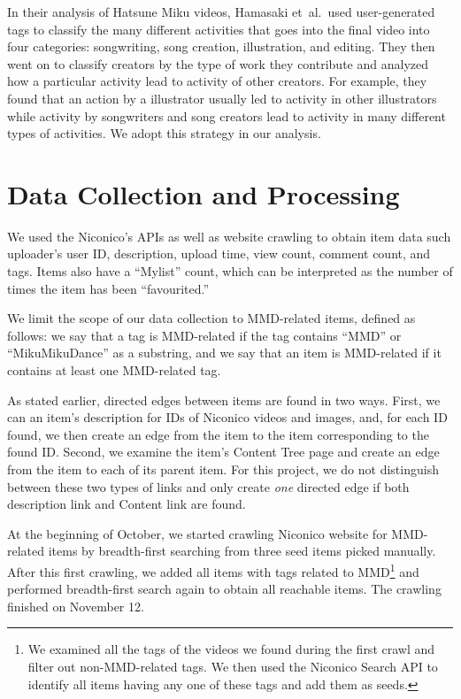 \documentclass[10pt, a4paper]{article}
\newcommand{\etal}{{et~al.}}
\begin{document}
In their analysis of Hatsune Miku videos, Hamasaki \etal~used user-generated tags to classify the many different activities that goes into the final video into four categories: songwriting, song creation, illustration, and editing. They then went on to classify creators by the type of work they contribute and analyzed how a particular activity lead to activity of other creators. For example, they found that an action by a illustrator usually led to activity in other illustrators while activity by songwriters and song creators lead to activity in many different types of activities. We adopt this strategy in our analysis. 

\cite{Cha:2009} \cite{Gruhl:2004} \cite{Leskovec:2006}

\section{Data Collection and Processing}
We used the Niconico's APIs as well as website crawling to obtain item data such uploader's user ID, description, upload time, view count, comment count, and tags. Items also have a ``Mylist'' count, which can be interpreted as the number of times the item has been ``favourited.'' 

We limit the scope of our data collection to MMD-related items, defined as follows: we say that a tag is MMD-related if the tag contains ``MMD'' or ``MikuMikuDance'' as a substring, and we say that an item is MMD-related if it contains at least one MMD-related tag. 

As stated earlier, directed edges between items are found in two ways. First, we can an item's description for IDs of Niconico videos and images, and, for each ID found, we then create an edge from the item to the item corresponding to the found ID. Second, we examine the item's Content Tree page and create an edge from the item to each of its parent item. For this project, we do not distinguish between these two types of links and only create \emph{one} directed edge if both description link and Content link are found.

At the beginning of October, we started crawling Niconico website for MMD-related items by breadth-first searching from three seed items picked manually. After this first crawling, we added all items with tags related to MMD\footnote{We examined all the tags of the videos we found during the first crawl and filter out non-MMD-related tags. We then used the Niconico Search API to identify all items having any one of these tags and add them as seeds.} and performed breadth-first search again to obtain all reachable items. The crawling finished on November 12.
\end{document}
